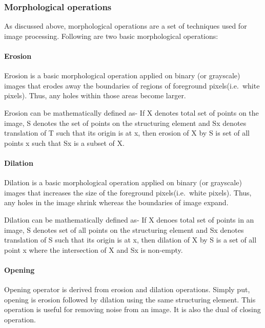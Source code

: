\documentclass[]{article}
\let\oldparagraph\paragraph
\renewcommand{\paragraph}[1]{\oldparagraph{#1}\mbox{}}
\begin{document}
\subsubsection{Morphological operations}\label{morphological-operations}

As discussed above, morphological operations are a set of techniques
used for image processing. Following are two basic morphological
operations:

\paragraph{Erosion}\label{erosion}

Erosion is a basic morphological operation applied on binary (or
grayscale) images that erodes away the boundaries of regions of
foreground pixels(i.e.~white pixels). Thus, any holes within those areas
become larger.

Erosion can be mathematically defined as- If X denotes total set of
points on the image, S denotes the set of points on the structuring
element and Sx denotes translation of T such that its origin is at x,
then erosion of X by S is set of all points x such that Sx is a subset
of X.

\paragraph{Dilation}\label{dilation}

Dilation is a basic morphological operation applied on binary (or
grayscale) images that increases the size of the foreground
pixels(i.e.~white pixels). Thus, any holes in the image shrink whereas
the boundaries of image expand.

Dilation can be mathematically defined as- If X denoes total set of
points in an image, S denotes set of all points on the structuring
element and Sx denotes translation of S such that its origin is at x,
then dilation of X by S is a set of all point x where the intersection
of X and Sx is non-empty.

\paragraph{Opening}\label{opening}

Opening operator is derived from erosion and dilation operations. Simply
put, opening is erosion followed by dilation using the same structuring
element. This operation is useful for removing noise from an image. It
is also the dual of closing operation.
\end{document}
